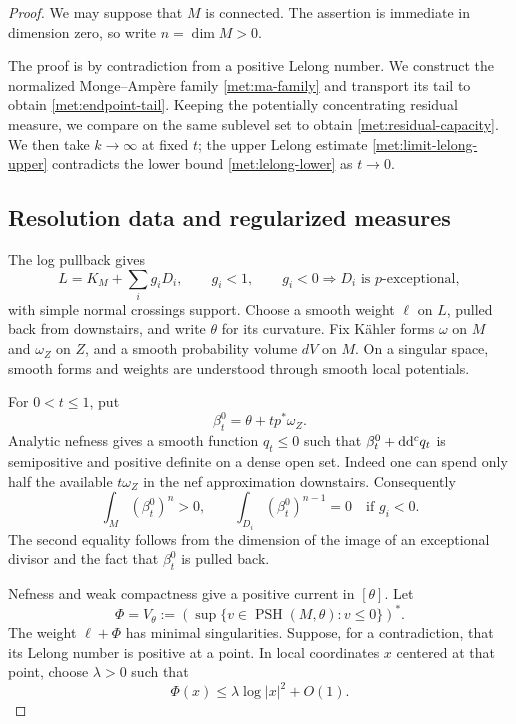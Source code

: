 \begin{proof}
We may suppose that \(M\) is connected.  The assertion is immediate in
dimension zero, so write \(n=\dim M>0\).

The proof is by contradiction from a positive Lelong number. We construct
the normalized Monge--Amp\`ere family \eqref{met:ma-family} and transport
its tail to obtain \eqref{met:endpoint-tail}. Keeping the potentially
concentrating residual measure, we compare on the same sublevel set to
obtain \eqref{met:residual-capacity}. We then take \(k\to\infty\) at
fixed \(t\); the upper Lelong estimate \eqref{met:limit-lelong-upper}
contradicts the lower bound \eqref{met:lelong-lower} as \(t\to0\).

\subsection*{Resolution data and regularized measures}

The log pullback gives
\begin{equation}
 \label{met:adjoint-data}
 L=K_M+\sum_i g_iD_i,
 \qquad g_i<1,
 \qquad g_i<0\Longrightarrow D_i\text{ is }p\text{-exceptional},
\end{equation}
with simple normal crossings support.  Choose a smooth weight \(\ell\)
on \(L\), pulled back from downstairs, and write \(\theta\) for its
curvature.  Fix K\"ahler forms \(\omega\) on \(M\) and \(\omega_Z\) on
\(Z\), and a smooth probability volume \(dV\) on \(M\).  On a singular
space, smooth forms and weights are understood through smooth local
potentials.

For \(0<t\leq1\), put
\begin{equation}
 \label{met:beta-zero}
 \beta_t^0=\theta+t p^*\omega_Z.
\end{equation}
Analytic nefness gives a smooth function \(q_t\leq0\) such that
\(\beta_t^0+\mathrm{d}\mathrm{d}^{c} q_t\) is semipositive and positive definite on a dense
open set.  Indeed one can spend only half the available \(t\omega_Z\)
in the nef approximation downstairs.  Consequently
\begin{equation}
 \label{met:exceptional-degree}
 \int_M(\beta_t^0)^n>0,
 \qquad
 \int_{D_i}(\beta_t^0)^{n-1}=0\quad\text{if }g_i<0.
\end{equation}
The second equality follows from the dimension of the image of an
exceptional divisor and the fact that \(\beta_t^0\) is pulled back.

Nefness and weak compactness give a positive current in \([\theta]\).
Let
\begin{equation}
 \label{met:minimal-envelope}
 \Phi=V_\theta
 :=\left(\sup\{v\in\operatorname{PSH}(M,\theta):v\leq0\}\right)^*.
\end{equation}
The weight \(\ell+\Phi\) has minimal singularities.  Suppose, for a
contradiction, that its Lelong number is positive at a point.  In local
coordinates \(x\) centered at that point, choose \(\lambda>0\) such that
\begin{equation}
 \label{met:assumed-pole}
 \Phi(x)\leq\lambda\log|x|^2+O(1).
\end{equation}


\end{proof}
